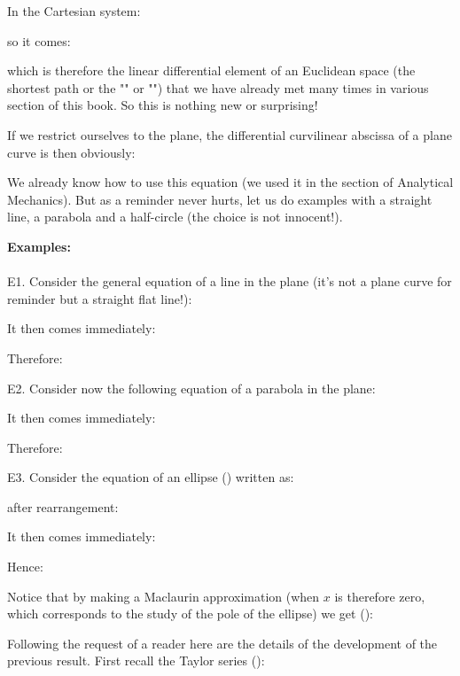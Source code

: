 {	In the Cartesian system:
	
	so it comes:
	
	which is therefore the linear differential element of an Euclidean space (the shortest path or the "" or "") that we have already met many times in various section of this book. So this is nothing new or surprising!
	
	If we restrict ourselves to the plane, the differential curvilinear abscissa of a plane curve is then obviously:
	
	We already know how to use this equation (we used it in the section of Analytical Mechanics). But as a reminder never hurts, let us do examples with a straight line, a parabola and a half-circle (the choice is not innocent!).
	\begin{tcolorbox}[colframe=black,colback=white,sharp corners]
	\textbf{{\Large {}}Examples:}\\\\
	E1. Consider the general equation of a line in the plane (it's not a plane curve for reminder but a straight flat line!):
	
	It then comes immediately:
	
	Therefore:
	
	E2. Consider now the following equation of a parabola in the plane:
	
	It then comes immediately:
	
	Therefore:
	
	E3. Consider the equation of an ellipse () written as:
	
	after rearrangement:
	
	It then comes immediately:
	
	Hence:
	
	\end{tcolorbox}
	
	\pagebreak
	\begin{tcolorbox}[colframe=black,colback=white,sharp corners]
	Notice that by making a Maclaurin approximation (when $x$ is therefore zero, which corresponds to the study of the pole of the ellipse) we get ():
	
	Following the request of a reader here are the details of the development of the previous result. First recall the Taylor series ():
	

\end{tcolorbox}}

